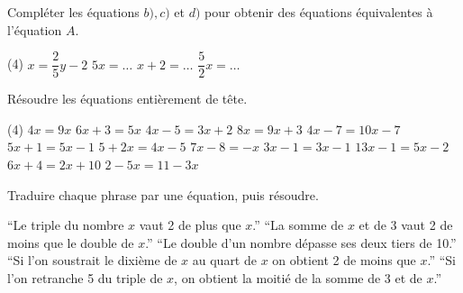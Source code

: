 \documentclass[a4paper,12pt]{report}
\begin{document}
\vspace*{-2\baselineskip}
\begin{acti}
Compléter les équations $b), c)$ et $d)$ pour obtenir des équations équivalentes à l'équation $A$.
	\begin{tasks}(4)
\task $x=\dfrac{2}{5} y-2$
\task $5 x=\ldots$
\task $x+2=\ldots$
\task $\dfrac{5}{2} x=\ldots$
	\end{tasks}
\end{acti}
\begin{acti}
Résoudre les équations entièrement de tête.
	\begin{tasks}(4)
\task $4 x=9 x$
\task $6 x+3=5 x$
\task $4 x-5=3 x+2$
\task $8 x=9 x+3$
\task $4 x-7=10 x-7$
\task $5 x+1=5 x-1$
\task $5+2 x=4 x-5$
\task $7 x-8=-x$
\task $3 x-1=3 x-1$
\task $13 x-1=5 x-2$
\task $6 x+4=2 x+10$
\task $2-5 x=11-3 x$
	\end{tasks}
\end{acti}
\begin{acti}
Traduire chaque phrase par une équation, puis résoudre.
	\begin{tasks}
		\task \enquote{Le triple du nombre $x$ vaut 2 de plus que $x$.}
		\task \enquote{La somme de $x$ et de 3 vaut 2 de moins que le double de $x$.}
	\task \enquote{Le double d'un nombre dépasse ses deux tiers de 10.}
\task \enquote{Si l'on soustrait le dixième de $x$ au quart de $x$ on obtient 2 de moins que $x$.}
\task \enquote{Si l'on retranche 5 du triple de $x$, on obtient la moitié de la somme de 3 et de $x$.}
	\end{tasks}
\end{acti}
\end{document}
